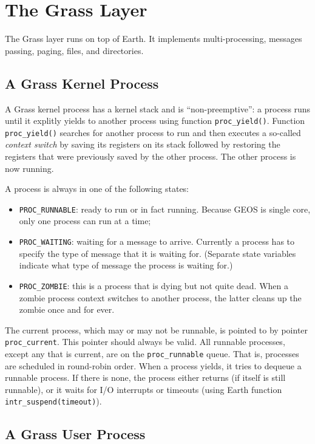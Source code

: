 \documentclass{article}
\begin{document}
\section{The Grass Layer}

The Grass layer runs on top of Earth.  It implements multi-processing,
messages passing, paging, files, and directories.

\subsection{A Grass Kernel Process}

A Grass kernel process has a kernel stack and is ``non-preemptive'':
a process runs until it explitly yields
to another process using function \texttt{proc\_yield()}.
Function \texttt{proc\_yield()} searches for another process to run
and then executes a so-called \emph{context switch} by saving its
registers on its stack followed by restoring the registers that were
previously saved by the other process.  The other process is now running.

A process is always in one of the following states:
\begin{itemize}
\item \texttt{PROC\_RUNNABLE}: ready to run or in fact running.  Because GEOS
is single core, only one process can run at a time;
\item \texttt{PROC\_WAITING}: waiting for a message to arrive.  Currently
a process has to specify the type of message that it is waiting for.
(Separate state variables indicate what type of message the process is waiting for.)
\item \texttt{PROC\_ZOMBIE}: this is a process that is dying but not quite
dead.  When a zombie process context switches to another process, the
latter cleans up the zombie once and for ever.
\end{itemize}

The current process, which may or may not be runnable, is pointed to by
pointer \texttt{proc\_current}.  This pointer should always be valid.
All runnable processes, except any that is current, are
on the \texttt{proc\_runnable} queue.  That is, processes are scheduled
in round-robin order.
When a process yields, it tries to dequeue a runnable process.  If there
is none, the process either returns (if itself is still runnable), or
it waits for I/O interrupts or timeouts
(using Earth function \texttt{intr\_suspend(timeout)}).

\subsection{A Grass User Process}
\end{document}
